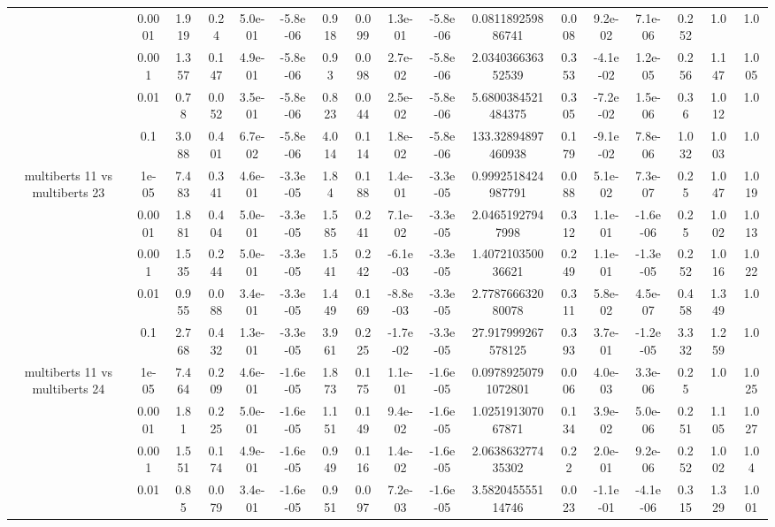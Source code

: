 \begin{tabular}{|c|c|c|c|c|c|c|c|c|c|c|c|c|c|c|c|c|}
 & 0.0001 & 1.919 & 0.24 & 5.0e-01 & -5.8e-06 & 0.918 & 0.099 & 1.3e-01 & -5.8e-06 & 0.081189259886741 & 0.008 & 9.2e-02 & 7.1e-06 & 0.252 & 1.0 & 1.0 \\
 & 0.001 & 1.357 & 0.147 & 4.9e-01 & -5.8e-06 & 0.93 & 0.098 & 2.7e-02 & -5.8e-06 & 2.034036636352539 & 0.353 & -4.1e-02 & 1.2e-05 & 0.256 & 1.147 & 1.005 \\
 & 0.01 & 0.78 & 0.052 & 3.5e-01 & -5.8e-06 & 0.823 & 0.044 & 2.5e-02 & -5.8e-06 & 5.6800384521484375 & 0.305 & -7.2e-02 & 1.5e-06 & 0.36 & 1.012 & 1.0 \\
 & 0.1 & 3.088 & 0.401 & 6.7e-02 & -5.8e-06 & 4.014 & 0.114 & 1.8e-02 & -5.8e-06 & 133.32894897460938 & 0.179 & -9.1e-02 & 7.8e-06 & 1.032 & 1.003 & 1.0 \\
\hline
\multirow{5}{*}{multiberts 11 vs multiberts 23} & 1e-05 & 7.483 & 0.341 & 4.6e-01 & -3.3e-05 & 1.84 & 0.188 & 1.4e-01 & -3.3e-05 & 0.9992518424987791 & 0.088 & 5.1e-02 & 7.3e-07 & 0.25 & 1.047 & 1.019 \\
 & 0.0001 & 1.881 & 0.404 & 5.0e-01 & -3.3e-05 & 1.585 & 0.241 & 7.1e-02 & -3.3e-05 & 2.04651927947998 & 0.312 & 1.1e-01 & -1.6e-06 & 0.25 & 1.002 & 1.013 \\
 & 0.001 & 1.535 & 0.244 & 5.0e-01 & -3.3e-05 & 1.541 & 0.242 & -6.1e-03 & -3.3e-05 & 1.407210350036621 & 0.249 & 1.1e-01 & -1.3e-05 & 0.252 & 1.016 & 1.022 \\
 & 0.01 & 0.955 & 0.088 & 3.4e-01 & -3.3e-05 & 1.449 & 0.169 & -8.8e-03 & -3.3e-05 & 2.778766632080078 & 0.311 & 5.8e-02 & 4.5e-07 & 0.458 & 1.349 & 1.0 \\
 & 0.1 & 2.768 & 0.432 & 1.3e-01 & -3.3e-05 & 3.961 & 0.225 & -1.7e-02 & -3.3e-05 & 27.917999267578125 & 0.393 & 3.7e-01 & -1.2e-05 & 3.332 & 1.259 & 1.0 \\
\hline
\multirow{5}{*}{multiberts 11 vs multiberts 24} & 1e-05 & 7.464 & 0.209 & 4.6e-01 & -1.6e-05 & 1.873 & 0.175 & 1.1e-01 & -1.6e-05 & 0.09789250791072801 & 0.006 & 4.0e-03 & 3.3e-06 & 0.25 & 1.0 & 1.025 \\
 & 0.0001 & 1.81 & 0.225 & 5.0e-01 & -1.6e-05 & 1.151 & 0.149 & 9.4e-02 & -1.6e-05 & 1.025191307067871 & 0.134 & 3.9e-02 & 5.0e-06 & 0.251 & 1.105 & 1.027 \\
 & 0.001 & 1.551 & 0.174 & 4.9e-01 & -1.6e-05 & 0.949 & 0.116 & 1.4e-02 & -1.6e-05 & 2.063863277435302 & 0.22 & 2.0e-01 & 9.2e-06 & 0.252 & 1.002 & 1.04 \\
 & 0.01 & 0.85 & 0.079 & 3.4e-01 & -1.6e-05 & 0.951 & 0.097 & 7.2e-03 & -1.6e-05 & 3.582045555114746 & 0.023 & -1.1e-01 & -4.1e-06 & 0.315 & 1.329 & 1.001 \\

\end{tabular}
